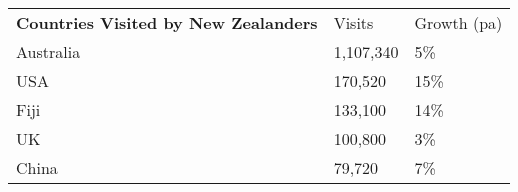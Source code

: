 \begin{tabular}[t]{p{4.8cm}>{\hfill}p{1.3cm}>{\hfill}p{1.4cm}}
 \textbf{Countries Visited by New Zealanders} & Visits & Growth (pa) \\ 
 Australia & 1,107,340 & 5\% \\ 
  USA &   170,520 & 15\% \\ 
  Fiji &   133,100 & 14\% \\ 
  UK &   100,800 & 3\% \\ 
  China &    79,720 & 7\% \\ 
  \end{tabular}
